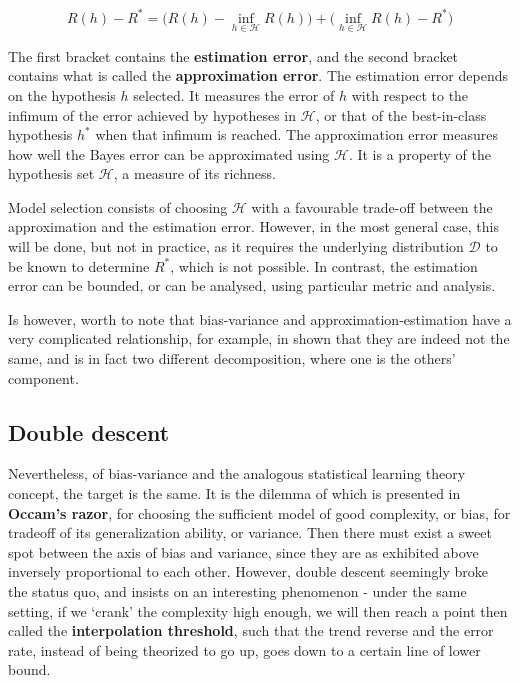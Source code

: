 \documentclass[10pt]{article} %
\begin{document}
\begin{equation}
    R(h) - R^{*} = \Big( R(h) - \inf_{h\in \mathcal{H}} R(h) \Big) + \Big( \inf_{h\in \mathcal{H}} R(h) - R^{*} \Big)
\end{equation}

The first bracket contains the \textbf{estimation error}, and the second bracket contains what is called the \textbf{approximation error}. The estimation error depends on the hypothesis $h$ selected. It measures the error of $h$ with respect to the infimum of the error achieved by hypotheses in $\mathcal{H}$, or that of the best-in-class hypothesis $h^{*}$ when that infimum is reached. The approximation error measures how well the Bayes error can be approximated using $\mathcal{H}$. It is a property of the hypothesis set $\mathcal{H}$, a measure of its richness. 

Model selection consists of choosing $\mathcal{H}$ with a favourable trade-off between the approximation and the estimation error. However, in the most general case, this will be done, but not in practice, as it requires the underlying distribution $\mathcal{D}$ to be known to determine $R^{*}$, which is not possible. In contrast, the estimation error can be bounded, or can be analysed, using particular metric and analysis. 

Is however, worth to note that bias-variance and approximation-estimation have a very complicated relationship, for example, in \cite{brown2024biasvariance} shown that they are indeed not the same, and is in fact two different decomposition, where one is the others' component.

\subsection{Double descent}

Nevertheless, of bias-variance and the analogous statistical learning theory concept, the target is the same. It is the dilemma of which is presented in \textbf{Occam's razor}, for choosing the sufficient model of good complexity, or bias, for tradeoff of its generalization ability, or variance. Then there must exist a sweet spot between the axis of bias and variance, since they are as exhibited above inversely proportional to each other. However, double descent seemingly broke the status quo, and insists on an interesting phenomenon - under the same setting, if we `crank' the complexity high enough, we will then reach a point then called the \textbf{interpolation threshold}, such that the trend reverse and the error rate, instead of being theorized to go up, goes down to a certain line of lower bound. 
\end{document}
